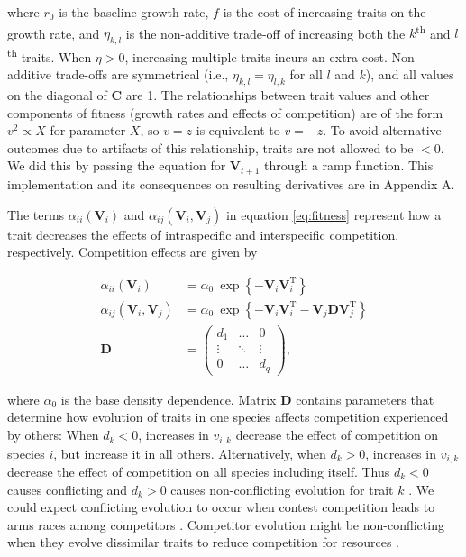 \noindent where $r_0$ is the baseline growth rate,
$f$ is the cost of increasing traits on the growth rate, and
$\eta_{k,l}$ is the non-additive trade-off of increasing both the
$k$\textsuperscript{th} and $l$\textsuperscript{th} traits.
When $\eta > 0$, increasing multiple traits incurs an extra cost.
Non-additive trade-offs are symmetrical (i.e., $\eta_{k,l} = \eta_{l,k}$ for all
$l$ and $k$), and all values on the diagonal of $\mathbf{C}$ are 1.
The relationships between trait values and other components of fitness
(growth rates and effects of competition) are of the form
$v^2 \propto X$ for parameter $X$, so $v = z$ is equivalent to $v = -z$.
To avoid alternative outcomes due to artifacts of this relationship,
traits are not allowed to be $< 0$.
We did this by passing the equation for $\mathbf{V}_{t+1}$ through a
ramp function.
This implementation and its consequences on resulting derivatives are in
Appendix A.


The terms $\alpha_{ii}(\mathbf{V}_i)$ and
$\alpha_{ij}(\mathbf{V}_i, \mathbf{V}_j)$
in equation \ref{eq:fitness} represent how a trait decreases the effects
of intraspecific and interspecific competition, respectively.
Competition effects are given by

\begin{equation} \label{eq:competition}
\begin{split}
    \alpha_{ii}(\mathbf{V}_i) &= \alpha_0 ~\exp \left\{- \mathbf{V}_i
        \mathbf{V}_i^{\textrm{T}} \right\} \\
    \alpha_{ij}(\mathbf{V}_i, \mathbf{V}_j) &= \alpha_0 ~\exp \left\{
        - \mathbf{V}_i \mathbf{V}_i^{\textrm{T}} -
        \mathbf{V}_j \mathbf{D} \mathbf{V}_j^{\textrm{T}} \right\} \\
    \mathbf{D} &= \begin{pmatrix}
        d_1     & \ldots    & 0 \\
        \vdots  & \ddots    & \vdots \\
        0       & \ldots    & d_q
        \end{pmatrix}
	\textrm{,}
\end{split}
\end{equation}

\noindent where $\alpha_0$ is the base density dependence.
Matrix $\mathbf{D}$ contains parameters that determine how evolution of traits
in one species affects competition experienced by others:
When $d_k < 0$, increases in $v_{i,k}$ decrease the
effect of competition on species $i$, but increase it in all others.
Alternatively, when $d_k > 0$, increases in $v_{i,k}$ decrease the effect of
competition on all species including itself.
Thus $d_k < 0$ causes conflicting and $d_k > 0$ causes non-conflicting evolution
for trait $k$ \citep{Northfield:2013if}.
We could expect conflicting evolution to occur when contest competition
leads to arms races among competitors
\citep{Abrams:1994th}.
Competitor evolution might be non-conflicting when they evolve
dissimilar traits to reduce competition for resources \citep{Roughgarden:1976eh}.



